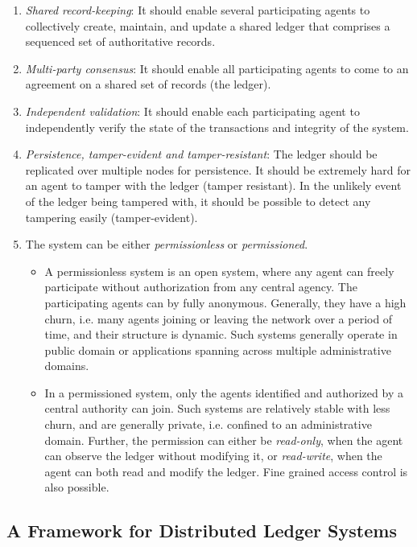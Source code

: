 \begin{enumerate}
	\item {\em Shared record-keeping}: It should enable several participating agents to collectively create, maintain,
		and update a shared ledger that comprises a sequenced set of authoritative records.
	\item {\em Multi-party consensus}: It should enable all participating agents to come to an agreement on a shared
		set of records (the ledger). 
	\item {\em Independent validation}: It should enable each participating agent to independently verify the state of 
		the transactions and integrity of the system.
	\item {\em Persistence, tamper-evident and tamper-resistant}: The ledger should be replicated over multiple nodes for 
		persistence. It should be extremely hard for an agent to tamper with the ledger (tamper resistant). In the
		unlikely event of the ledger being tampered with, it should be possible to detect any tampering easily (tamper-evident).
	\item The system can be either {\em permissionless} or {\em permissioned}.
		\begin{itemize}
			\item A permissionless system is an open system, where any agent can freely participate without authorization 
				from any central agency. The participating agents can by fully anonymous. Generally, they have a high 
				churn, i.e. many agents joining or leaving the network over a period of time, and their structure is 
				dynamic. Such systems generally operate in public domain or applications spanning across multiple 
				administrative domains. 
			\item In a permissioned system, only the agents identified and authorized by a central authority can join. 
				Such systems are relatively stable with less churn, and are generally private, i.e. confined to an 
				administrative domain.
				Further, the permission can either be {\em read-only}, when the agent can observe the ledger without 
				modifying it, or {\em read-write}, when the agent can both read and modify the ledger. Fine grained
				access control is also possible.
		\end{itemize}
\end{enumerate}



\subsection{A Framework for Distributed Ledger Systems}

